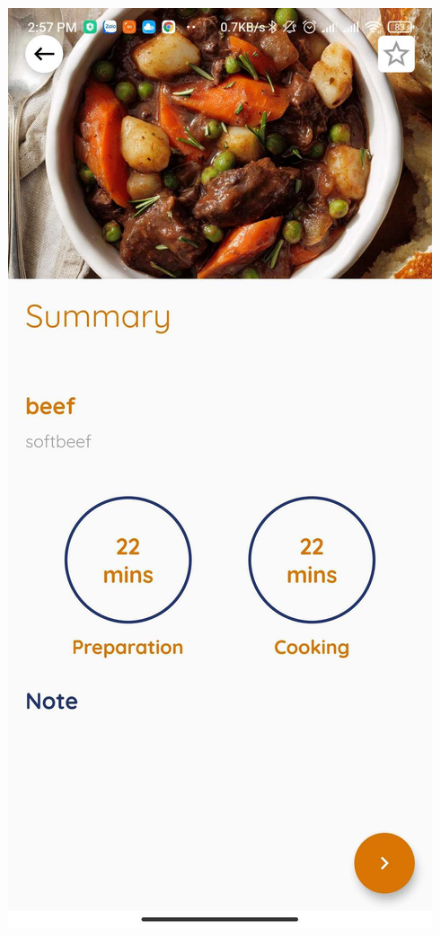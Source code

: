 \documentclass{article}
\begin{document}
    \begin{figure}[h!]
    \centering
    \includegraphics[scale=0.1]{Images/Favorite-unchecked.jpg}

\end{figure}
\end{document}
